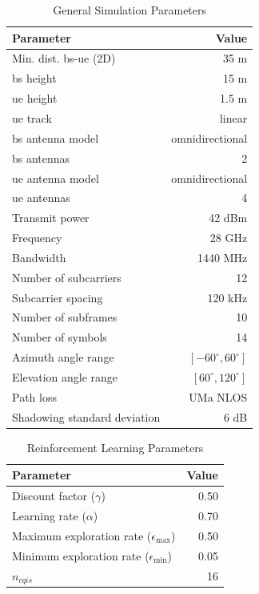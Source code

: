 \begin{table}[!htb]
	\centering
	\caption{General  Simulation Parameters}
	\label{tab:la-sim-params}
	\begin{tabularx}{0.7\columnwidth}{X r}
		\toprule
		\textbf{Parameter} 	& \textbf{Value} \\
		\midrule
		Min. dist. \gls{bs}-\gls{ue} (2D) & 35 m\\
		\gls{bs} height & 15 m\\
		\gls{ue} height & 1.5 m\\
		\gls{ue} track & linear\\
		\gls{bs}  antenna model & omnidirectional \\
		\gls{bs}  antennas & 2 \\
		\gls{ue} antenna model & omnidirectional \\
		\gls{ue} antennas & 4 \\
		Transmit power & 42 dBm\\
		Frequency & 28 GHz\\
		Bandwidth & 1440 MHz\\
		Number of subcarriers  & 12\\
		Subcarrier spacing & 120 kHz\\
		Number of subframes & 10\\
		Number of symbols & 14\\
		Azimuth angle range & $[-60^{\circ}, 60^{\circ}]$\\
		Elevation angle range & $[60^{\circ}, 120^{\circ}]$\\
		Path loss & UMa NLOS\\
		Shadowing standard deviation & 6 dB\\
		\bottomrule
	\end{tabularx}
\end{table}



\begin{table}[!htb]
	\centering
	\caption{Reinforcement Learning Parameters}
	\label{tab:la-rl-params}
	\begin{tabularx}{0.6\columnwidth}{X r}
		\toprule
		\textbf{Parameter} 	 & \textbf{Value} \\
		\midrule
		Discount factor ($\gamma$)  & 0.50\\
		Learning rate ($\alpha$) & 0.70\\
		Maximum exploration rate ($\epsilon_{\max}$) & 0.50\\
		Minimum exploration rate ($\epsilon_{\min}$) & 0.05\\
		$n_{cqis}$ & 16 \\
		\bottomrule
	\end{tabularx}
\end{table}

